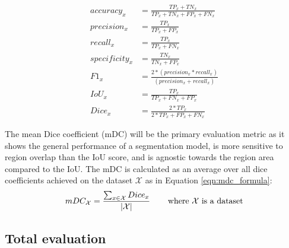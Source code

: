 \documentclass[draft,final]{vutinfth} %
\begin{document}
\begin{equation} \label{eqn:metrics_formulas}
\begin{aligned}
    accuracy_{x} & = \frac{TP_{x} + TN_{x}}{TP_{x} + TN_{x} + FP_{x} + FN_{x}}
    \\
    precision_{x} & = \frac{TP_{x}}{TP_{x} + FP_{x}}
    \\
    recall_{x} & = \frac{TP_{x}}{TP_{x} + FN_{x}}
    \\
    specificity_{x} & = \frac{TN_{x}}{TN_{x} + FP_{x}}
    \\
    F1_{x} & = \frac{2 * (precision_{x} * recall_{x})}{(precision_{x} + recall_{x})}
    \\
    IoU_{x} & = \frac{TP_{x}}{TP_{x} + FN_{x} + FP_{x}}
    \\
    Dice_{x} & = \frac{2 * TP_{x}}{2 * TP_{x} + FP_{x} + FN_{x}}
\end{aligned}
\end{equation}

The mean Dice coefficient (mDC) will be the primary evaluation metric as it shows the general performance of a segmentation model, is more sensitive to region overlap than the IoU score, and is agnostic towards the region area compared to the IoU. The mDC is calculated as an average over all dice coefficients achieved on the dataset $\mathcal{X}$ as in Equation \eqref{eqn:mdc_formula}: 
\begin{equation} \label{eqn:mdc_formula}
    mDC_{\mathcal{X}} = \frac{\sum_{x\in\mathcal{X}} Dice_x}{|\mathcal{X}|} \text{\hspace{1.8em} where } \mathcal{X} \text{ is a dataset}
\end{equation}

\subsection{Total evaluation}
\end{document}
